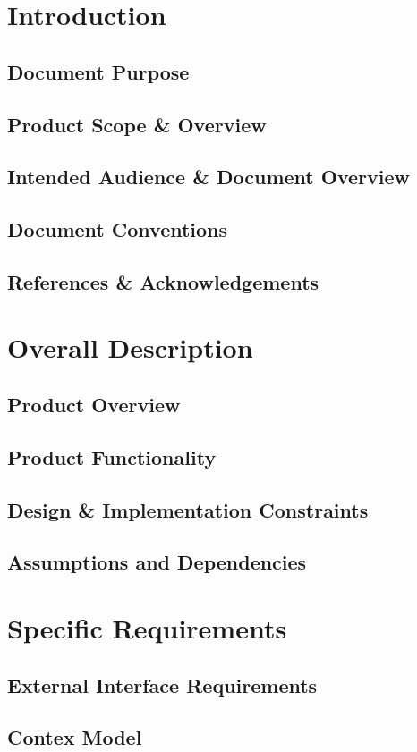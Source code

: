 \documentclass{report}
\begin{document}
	\chapter{Introduction}
		\section{Document Purpose}
		\section{Product Scope \& Overview}
		\section{Intended Audience \& Document Overview}
		\section{Document Conventions}
		\section{References \& Acknowledgements}
	\chapter{Overall Description}
		\section{Product Overview}
		\section{Product Functionality}
		\section{Design \& Implementation Constraints}
		\section{Assumptions and Dependencies}
	\chapter{Specific Requirements}
		\section{External Interface Requirements}
		\section{Contex Model}
\end{document}
